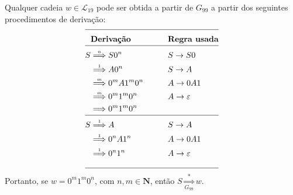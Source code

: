\documentclass[12pt]{article}
\def\myling{{19}} %
\newcommand{\deriv}[1]{\stackrel{\scriptscriptstyle #1}{\Longrightarrow}}
\newcommand{\derivG}[2]{\mathop{\Longrightarrow}\limits_{\scriptscriptstyle #2}^{\scriptscriptstyle #1}}
\begin{document}
\begin{tcolorbox}[breakable,rounded corners, colback=yellow!5, colframe=red!40!black, title={$\mathcal{L}_{\myling} \subseteq\mathcal{L}(G_{99})$, ou seja, se $w\in \mathcal{L}_{\myling}$, então $S \deriv{*} w$.}]
Qualquer cadeia $w\in \mathcal{L}_{\myling}$ pode ser obtida a partir de $G_{99}$ a partir dos seguintes procedimentos de derivação:
		\begin{alignat*}{2}
		\cline{1-4}
		   & \textbf{Derivação}   &\qquad& \textbf{Regra usada}\\[-10pt]
		\cline{1-4}
		 S & \deriv{n} S0^n                     & &S \to S0          \\ 
		   & \deriv{1} A0^n                     & &S \to A           \\
           & \deriv{m} 0^mA1^m0^n               & &A \to 0A1         \\
           & \deriv{m} 0^m1^m0^n                & &A \to \varepsilon \\
		   & \deriv{}  0^m1^m0^n                & & \\[-10pt]
        \cline{1-4}
         S & \deriv{1} A                     & &S \to A           \\ 
		   & \deriv{1} 0^nA1^n               & &A \to 0A1         \\
           & \deriv{1} 0^n1^n                & &A \to \varepsilon \\ 
        \cline{1-4}
		\end{alignat*}
  Portanto, se $w = 0^m1^m0^n$, com $n,m \in \mathbf{N}$, então $S \derivG{*}{G_{99}} w$.
\end{tcolorbox}
\end{document}

